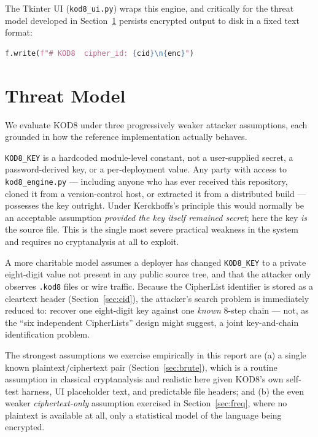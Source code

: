 \documentclass[11pt]{article}
\begin{document}
The Tkinter UI (\texttt{kod8\_ui.py}) wraps this engine, and critically
for the threat model developed in Section~\ref{sec:threat} persists
encrypted output to disk in a fixed text format:

\begin{lstlisting}[language=Python]
f.write(f"# KOD8  cipher_id: {cid}\n{enc}")
\end{lstlisting}

\section{Threat Model}
\label{sec:threat}

We evaluate KOD8 under three progressively weaker attacker assumptions,
each grounded in how the reference implementation actually behaves.

\begin{description}[leftmargin=1.4em, style=nextline]
  \item[\textbf{T1 Source-available (white-box).}]
    \texttt{KOD8\_KEY} is a hardcoded module-level constant, not a
    user-supplied secret, a password-derived key, or a per-deployment
    value. Any party with access to \texttt{kod8\_engine.py} --- including
    anyone who has ever received this repository, cloned it from a
    version-control host, or extracted it from a distributed build ---
    possesses the key outright. Under Kerckhoffs's principle this would
    normally be an acceptable assumption \emph{provided the key itself
    remained secret}; here the key \emph{is} the source file. This is the
    single most severe practical weakness in the system and requires no
    cryptanalysis at all to exploit.
  \item[\textbf{T2 Ciphertext-and-header-only, key rotated.}]
    A more charitable model assumes a deployer has changed
    \texttt{KOD8\_KEY} to a private eight-digit value not present in any
    public source tree, and that the attacker only observes
    \texttt{.kod8} files or wire traffic. Because the CipherList
    identifier is stored as a cleartext header (Section~\ref{sec:cid}),
    the attacker's search problem is immediately reduced to: recover one
    eight-digit key against one \emph{known} 8-step chain --- not, as the
    ``six independent CipherLists'' design might suggest, a joint
    key-and-chain identification problem.
  \item[\textbf{T3 Known-plaintext / ciphertext-only.}]
    The strongest assumptions we exercise empirically in this report are
    (a) a single known plaintext/ciphertext pair (Section~\ref{sec:brute}),
    which is a routine assumption in classical cryptanalysis and
    realistic here given KOD8's own self-test harness, UI placeholder
    text, and predictable file headers; and (b) the even weaker
    \emph{ciphertext-only} assumption exercised in
    Section~\ref{sec:freq}, where no plaintext is available at all,
    only a statistical model of the language being encrypted.
\end{description}
\end{document}
